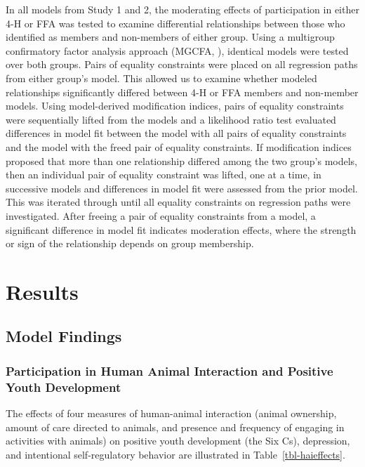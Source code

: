 \documentclass[
  jou,
  longtable,
  nolmodern,
  notxfonts,
  notimes,
  colorlinks=true,linkcolor=blue,citecolor=blue,urlcolor=blue]{apa7}
\begin{document}
In all models from Study 1 and 2, the moderating effects of
participation in either 4-H or FFA was tested to examine differential
relationships between those who identified as members and non-members of
either group. Using a multigroup confirmatory factor analysis approach
(MGCFA, ), identical models
were tested over both groups. Pairs of equality constraints were placed
on all regression paths from either group's model. This allowed us to
examine whether modeled relationships significantly differed between 4-H
or FFA members and non-member models. Using model-derived modification
indices, pairs of equality constraints were sequentially lifted from the
models and a likelihood ratio test evaluated differences in model fit
between the model with all pairs of equality constraints and the model
with the freed pair of equality constraints. If modification indices
proposed that more than one relationship differed among the two group's
models, then an individual pair of equality constraint was lifted, one
at a time, in successive models and differences in model fit were
assessed from the prior model. This was iterated through until all
equality constraints on regression paths were investigated. After
freeing a pair of equality constraints from a model, a significant
difference in model fit indicates moderation effects, where the strength
or sign of the relationship depends on group membership.

\section{Results}\label{results}

\subsection{Model Findings}\label{model-findings}

\subsubsection{Participation in Human Animal Interaction and Positive
Youth
Development}\label{participation-in-human-animal-interaction-and-positive-youth-development}

The effects of four measures of human-animal interaction (animal
ownership, amount of care directed to animals, and presence and
frequency of engaging in activities with animals) on positive youth
development (the Six Cs), depression, and intentional self-regulatory
behavior are illustrated in Table~\ref{tbl-haieffects}.
\end{document}
